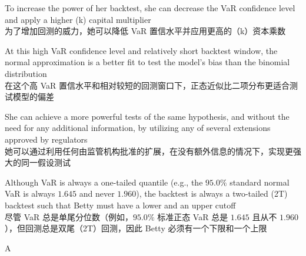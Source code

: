 \documentclass{article}
\begin{document}
\begin{choices}
    \item To increase the power of her backtest, she can decrease the VaR confidence level and apply a higher (k) capital multiplier\\
    为了增加回测的威力，她可以降低 VaR 置信水平并应用更高的（k）资本乘数
    \item At this high VaR confidence level and relatively short backtest window, the normal approximation is a better fit to test the model's bias than the binomial distribution\\
    在这个高 VaR 置信水平和相对较短的回测窗口下，正态近似比二项分布更适合测试模型的偏差
    \item She can achieve a more powerful tests of the same hypothesis, and without the need for any additional information, by utilizing any of several extensions approved by regulators\\
    她可以通过利用任何由监管机构批准的扩展，在没有额外信息的情况下，实现更强大的同一假设测试
    \item Although VaR is always a one-tailed quantile (e.g., the $95.0\%$ standard normal VaR is always $1.645$ and never $1.960$), the backtest is always a two-tailed (2T) backtest such that Betty must have a lower and an upper cutoff\\
    尽管 VaR 总是单尾分位数（例如，$95.0\%$ 标准正态 VaR 总是 $1.645$ 且从不 $1.960$），但回测总是双尾（2T）回测，因此 Betty 必须有一个下限和一个上限
\end{choices}

\begin{correctanswer}
    A
\end{correctanswer}
\end{document}
